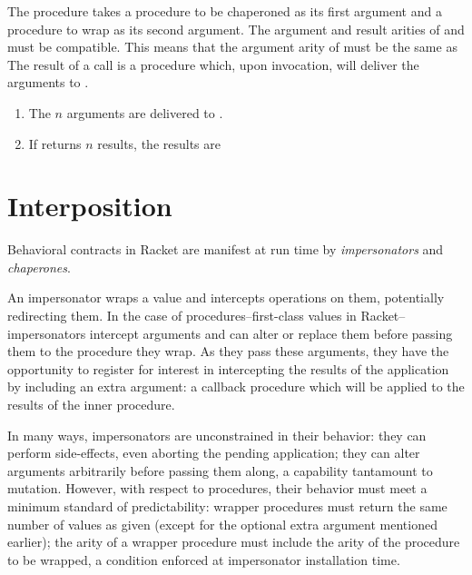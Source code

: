 \documentclass{sigplanconf}
\begin{document}
The  procedure takes a procedure  to be chaperoned as its first argument and a procedure  to wrap  as its second argument.
The argument and result arities of  and  must be compatible.
This means that the argument arity of  must be the same as
The result of a  call is a procedure which, upon invocation, will deliver the arguments to .
\begin{enumerate}
\item The $n$ arguments are delivered to .
\item If  returns $n$ results, the results are 
\end{enumerate}


\section{Interposition}

Behavioral contracts in Racket are manifest at run time by \emph{impersonators} and \emph{chaperones}.

An impersonator wraps a value and intercepts operations on them, potentially redirecting them.
In the case of procedures--first-class values in Racket--impersonators intercept arguments and can alter or replace them before passing them to the procedure they wrap.
As they pass these arguments, they have the opportunity to register for interest in intercepting the results of the application by including an extra argument: a callback procedure which will be applied to the results of the inner procedure.

In many ways, impersonators are unconstrained in their behavior: they can perform side-effects, even aborting the pending application; they can alter arguments arbitrarily before passing them along, a capability tantamount to mutation.
However, with respect to procedures, their behavior must meet a minimum standard of predictability: wrapper procedures must return the same number of values as given (except for the optional extra argument mentioned earlier); the arity of a wrapper procedure must include the arity of the procedure to be wrapped, a condition enforced at impersonator installation time.
\end{document}
